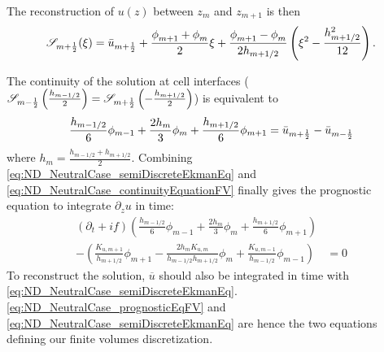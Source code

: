 The reconstruction of $u(z)$ between $z_m$ and $z_{m+1}$
is then
\begin{equation}
\label{eq:ND_NeutralCase_quadraticReconstruction}
{\cal S}_{m+\frac{1}{2}}(\xi) =
	\Bar{u}_{m+\frac{1}{2}} + 
	\frac{\phi_{m+1}^{} + \phi_{m}^{}}{2} \xi
	+ \frac{\phi_{m+1}^{} - \phi_{m}^{}}{2h_{m+1/2}}
	\left(\xi^2 - \frac{h_{m+1/2}^2}{12}\right).
\end{equation}

The continuity of the solution at cell interfaces (${\cal S}_{m-\frac{1}{2}}\left(\frac{h_{m-1/2}}{2}\right) = {\cal S}_{m+\frac{1}{2}}\left(-\frac{h_{m+1/2}}{2}\right)$) is equivalent to
%
\begin{equation}
\label{eq:ND_NeutralCase_continuityEquationFV}
\frac{h_{m-1/2}}{6} \phi_{m-1} 
+ \frac{2h_{m}}{3} \phi_m  
+ \frac{h_{m+1/2}}{6} \phi_{m+1} = \Bar{u}_{m+\frac{1}{2}} - \Bar{u}_{m-\frac{1}{2}}
\end{equation}
where $h_m = \frac{h_{m-1/2} + h_{m+1/2}}{2}$.
Combining \eqref{eq:ND_NeutralCase_semiDiscreteEkmanEq}
and \eqref{eq:ND_NeutralCase_continuityEquationFV} finally gives
the prognostic equation to integrate
$\partial_z u$ in time:
\begin{equation}
\begin{aligned}
\label{eq:ND_NeutralCase_prognosticEqFV}
(\partial_t + if) \left( \frac{h_{m-1/2}}{6} \phi_{m-1} 
+ \frac{2h_m}{3} \phi_m  
+ \frac{h_{m+1/2}}{6} \phi_{m+1} \right)& \\
-
    \left(
	\frac{K_{u, m+1}}{ h_{m+1/2}}\phi_{m+1} -
	\frac{2 h_m K_{u,m}}{h_{m-1/2} h _{m+1/2}}\phi_m +
	\frac{K_{u,m-1}}{h_{m-1/2}}\phi_{m-1}
    \right)
&= 0
\end{aligned}
\end{equation}
To reconstruct the solution, $\overline{u}$ should also be 
integrated in time with \eqref{eq:ND_NeutralCase_semiDiscreteEkmanEq}.
\eqref{eq:ND_NeutralCase_prognosticEqFV} and
\eqref{eq:ND_NeutralCase_semiDiscreteEkmanEq} are hence the two 
equations defining our finite volumes discretization.


